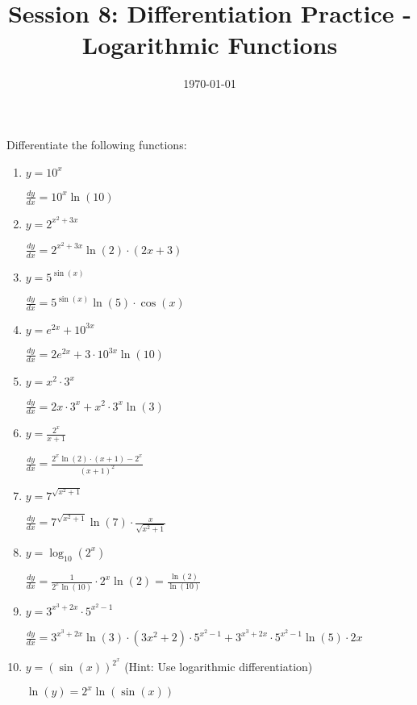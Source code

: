 \documentclass{article}
\begin{document}
\title{Session 8: Differentiation Practice - Logarithmic Functions}
\date{\today}
\maketitle

Differentiate the following functions:

\begin{enumerate}
\item $y = 10^x$

    $\frac{dy}{dx} = 10^x \ln(10)$

\item $y = 2^{x^2 + 3x}$

    $\frac{dy}{dx} = 2^{x^2 + 3x} \ln(2) \cdot (2x + 3)$

\item $y = 5^{\sin(x)}$

    $\frac{dy}{dx} = 5^{\sin(x)} \ln(5) \cdot \cos(x)$

\item $y = e^{2x} + 10^{3x}$

    $\frac{dy}{dx} = 2e^{2x} + 3 \cdot 10^{3x} \ln(10)$

\item $y = x^2 \cdot 3^x$

    $\frac{dy}{dx} = 2x \cdot 3^x + x^2 \cdot 3^x \ln(3)$

\item $y = \frac{2^x}{x + 1}$

    $\frac{dy}{dx} = \frac{2^x \ln(2) \cdot (x+1) - 2^x}{(x+1)^2}$

\item $y = 7^{\sqrt{x^2 + 1}}$

    $\frac{dy}{dx} = 7^{\sqrt{x^2 + 1}} \ln(7) \cdot \frac{x}{\sqrt{x^2 + 1}}$

\item $y = \log_{10}(2^x)$

    $\frac{dy}{dx} = \frac{1}{2^x \ln(10)} \cdot 2^x \ln(2) = \frac{\ln(2)}{\ln(10)}$

\item $y = 3^{x^3 + 2x} \cdot 5^{x^2 - 1}$

    $\frac{dy}{dx} = 3^{x^3 + 2x} \ln(3) \cdot (3x^2 + 2) \cdot 5^{x^2 - 1} + 3^{x^3 + 2x} \cdot 5^{x^2 - 1} \ln(5) \cdot 2x$

\item $y = (\sin(x))^{2^x}$ (Hint: Use logarithmic differentiation)

    $\ln(y) = 2^x \ln(\sin(x))$


\end{enumerate}
\end{document}
